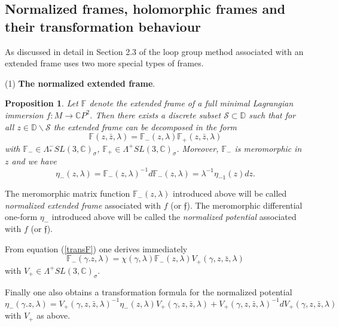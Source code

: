 \documentclass[a4paper,11pt]{amsart}
\newtheorem{proposition}[theorem]{Proposition}
\theoremstyle{definition}
\numberwithin{equation}{section}
\newcommand{\C}{\mathbb{C}}
\newcommand{\D}{\mathbb{D}}
\newcommand{\F}{\mathbb{F}}
\newcommand{\f}{\mathfrak{f}}
\begin{document}
\subsection{Normalized frames, holomorphic frames and their transformation behaviour}

As discussed in detail in Section 2.3 of \cite{DoMaB1} the loop group method associated with an extended frame uses two more special types of frames.

(1) \textbf{The normalized extended frame}. 

\begin{proposition}
Let $\F$ denote the extended frame of a full minimal Lagrangian
immersion  $f: M \rightarrow \C P^2$. Then there exists a discrete subset $\mathcal{S} \subset \D$ such that for all $ z \in \D\backslash \mathcal{S} $ the extended frame can be decomposed in the form
\begin{equation}
\F (z, \bar z, \lambda) = \F_-(z,\lambda) \F_+(z, \bar z, \lambda)
\end{equation}
with $\F_{-}\in \Lambda^{-}_* SL(3,\C)_\sigma$, $\F_{+} \in \Lambda^{+} SL(3,\C)_\sigma$.
Moreover, $\F_-$ is meromorphic in $z$ and we have 
\begin{equation}
\eta_-(z, \lambda) = \F_-(z,\lambda)^{-1} d\F_-(z, \lambda ) =
 \lambda^{-1} \eta_{-1} (z) dz. 
 \end{equation}
\end{proposition}

The meromorphic matrix function $\F_-(z, \lambda)$ introduced above will be called 
\emph{normalized extended frame} associated with $f$ (or $\f$).
The meromorphic differential one-form $\eta_-$ introduced above will be called the
\emph{normalized potential} associated with $f$ (or $\f$).

From equation (\ref{transF}) one derives immediately
\begin{equation} \label{transFminus}
\F_-(\gamma.z, \lambda) = \chi(\gamma,\lambda) \F_-(z, \lambda) V_+(\gamma, z, \bar z, \lambda)
\end{equation}
with  $V_+ \in \Lambda^{+} SL(3,\C)_\sigma$.

Finally one also obtains a transformation formula for the normalized potential
\begin{equation} \label{transetaminus}
\eta_-(\gamma.z, \lambda) =  V_+(\gamma, z, \bar z, \lambda)^{-1} \eta_-(z, \lambda) V_+(\gamma, z, \bar z, \lambda) + V_+(\gamma, z, \bar z, \lambda)^{-1} dV_+(\gamma, z, \bar z, \lambda)
\end{equation}
with  $V_+$ as above.
\end{document}
